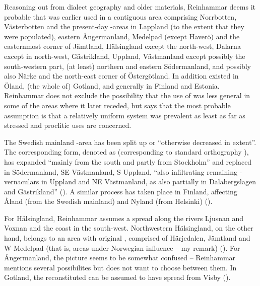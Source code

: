 Reasoning out from dialect geography and older materials, Reinhammar deems it probable that  was earlier used in a contiguous area comprising Norrbotten, Västerbotten and the present-day -areas in Lappland (to the extent that they were populated), eastern Ångermanland, Medelpad (except Haverö) and the easternmost corner of Jämtland, Hälsingland except the north-west, Dalarna except in north-west, Gästrikland, Uppland, Västmanland except possibly the south-western part, (at least) northern and eastern Södermanland, and possibly also Närke and the north-east corner of Östergötland. In addition  existed in Öland, (the whole of) Gotland, and generally in Finland and Estonia. Reinhammar does not exclude the possibility that the use of  was less general in some of the areas where it later receded, but says that the most probable assumption is that a relatively uniform system was prevalent as least as far as stressed and proclitic uses are concerned.

The Swedish mainland -area has been split up or “otherwise decreased in extent”. The corresponding form, denoted as  (corresponding to standard orthography ), has expanded “mainly from the south and partly from Stockholm” and replaced  in Södermanland, SE Västmanland, S Uppland, “also infiltrating remaining -vernaculars in Uppland and NE Västmanland, as also partially in Dalabergslagen and Gästrikland” (\citet[186]{Reinhammar1975}). A similar process has taken place in Finland, affecting Åland (from the Swedish mainland) and Nyland (from Helsinki) (\citet[187]{Reinhammar1975}).

For Hälsingland, Reinhammar assumes a spread along the rivers Ljusnan and Voxnan and the coast in the south-west. Northwestern Hälsingland, on the other hand, belongs to an area with original , comprised of Härjedalen, Jämtland and W Medelpad (that is, areas under Norwegian influence – my remark) (\citet[186]{Reinhammar1975}). For Ångermanland, the picture seems to be somewhat confused – Reinhammar mentions several possibilites but does not want to choose between them. In Gotland, the reconstituted  can be assumed to have spread from Visby (\citet[188]{Reinhammar1975}). 

